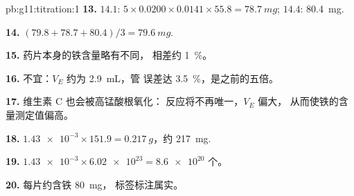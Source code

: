 \begin{solution}{pb:g11:titration:1}
\textbf{13.} $14.1$: $5 \times 0.0200 \times 0.0141 \times 55.8 =
\qty{78.7}{mg}$; $14.4$: \qty{80.4}{mg}.

\textbf{14.} $(79.8 + 78.7 + 80.4)/3 = \qty{79.6}{mg}$.

\textbf{15.} 药片本身的铁含量略有不同，
相差约 \qty{1}{\percent}。

\textbf{16.} 不宜：$V_E$ 约为 \qty{2.9}{mL}，管
误差达 \qty{3.5}{\percent}，是之前的五倍。

\textbf{17.} 维生素 C 也会被高锰酸根氧化：
反应将不再唯一，$V_E$ 偏大，
从而使铁的含量测定值偏高。

\textbf{18.} $\num{1.43e-3} \times 151.9 = \qty{0.217}{g}$，约
\qty{217}{mg}.

\textbf{19.} $\num{1.43e-3} \times \num{6.02e23} = \num{8.6e20}$ 个。

\textbf{20.} 每片约含铁 \qty{80}{mg}，
标签标注属实。
\end{solution}
